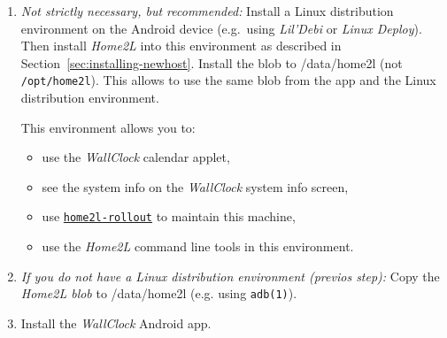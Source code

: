 \documentclass[12pt,english,parskip=half]{scrreprt}
\newcommand{\lst}[1]{\colorbox{lstbackground}{\ttfamily\footnotesize#1}}
\newcommand{\idx}[1]{#1\index{#1}}
\newcommand{\toolref}[1]{\hyperref[tool:#1]{\texttt{\idx{#1}}}}
\begin{document}
\begin{enumerate}
  \item \emph{Not strictly necessary, but recommended:} Install a Linux distribution
    environment on the Android device (e.g.~using \emph{Lil'Debi} or \emph{Linux Deploy}).
    Then install \emph{Home2L} into this environment as described in Section~\ref{sec:installing-newhost}.
    Install the blob to \lst{/data/home2l} (not \texttt{/opt/home2l}). This allows to
    use the same blob from the app and the Linux distribution environment.

    This environment allows you to:
    \begin{itemize}
      \item use the \emph{WallClock} calendar applet,
      \item see the system info on the \emph{WallClock} system info screen,
      \item use \toolref{home2l-rollout} to maintain this machine,
      \item use the \emph{Home2L} command line tools in this environment.
    \end{itemize}

  \item \emph{If you do not have a Linux distribution environment (previos step):}
    Copy the \emph{Home2L blob} to \lst{/data/home2l} (e.g. using \texttt{adb(1)}).

  \item Install the \emph{WallClock} Android app.


\end{enumerate}
\end{document}
